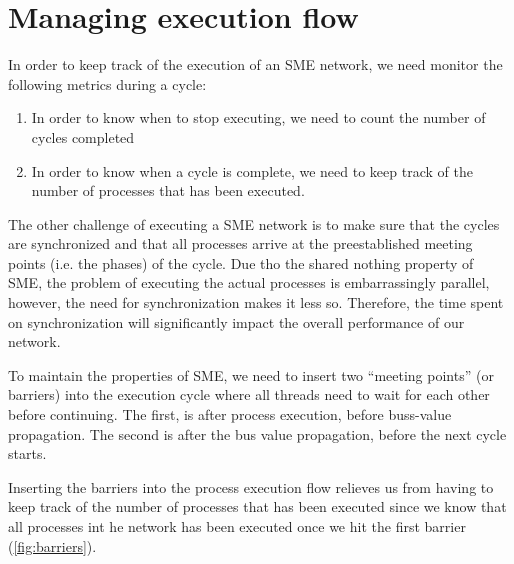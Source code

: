 \section{Managing execution flow}
In order to keep track of the execution of an SME network, we need monitor the
following metrics during a cycle:

\begin{enumerate}
\item In order to know when to stop executing, we need to count the
  number of cycles completed
\item In order to know when a cycle is complete, we need to keep track
  of the number of processes that has been executed.
\end{enumerate}

The other challenge of executing a SME network is to make sure that
the cycles are synchronized and that all processes arrive at the
preestablished meeting points (i.e. the phases) of the cycle.  Due tho
the shared nothing property of SME, the problem of executing the
actual processes is embarrassingly parallel, however, the need for
synchronization makes it less so. Therefore, the time spent on
synchronization will significantly impact the overall performance of
our network.

To maintain the properties of SME, we need to insert two
"`meeting points"' (or barriers) into the execution cycle where all
threads need to wait for each other before continuing. The first, is
after process execution, before buss-value propagation. The second
is after the bus value propagation, before the next cycle starts.

Inserting the barriers into the process execution flow relieves us
from having to keep track of the number of processes that has been
executed since we know that all processes int he network has been
executed once we hit the first barrier (\cref{fig:barriers}).



